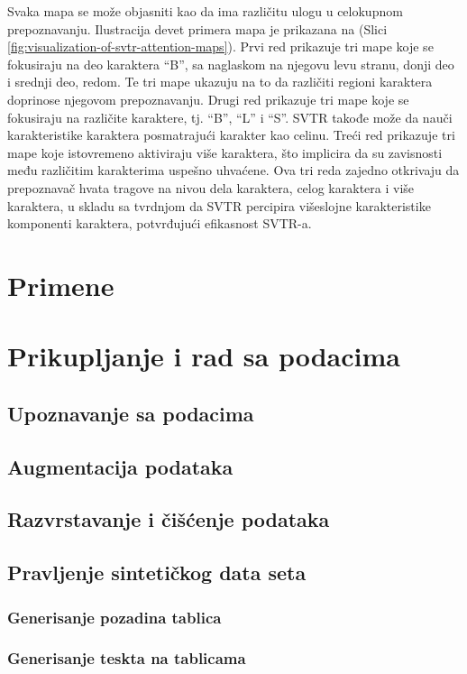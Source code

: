 \documentclass[a4paper,12pt]{article}
\begin{document}
	Svaka mapa se može objasniti kao da ima različitu ulogu u celokupnom prepoznavanju. Ilustracija devet primera mapa je prikazana na (Slici \ref{fig:visualization-of-svtr-attention-maps}). Prvi red prikazuje tri mape koje se fokusiraju na deo karaktera ``B'', sa naglaskom na njegovu levu stranu, donji deo i srednji deo, redom. Te tri mape ukazuju na to da različiti regioni karaktera doprinose njegovom prepoznavanju. Drugi red prikazuje tri mape koje se fokusiraju na različite karaktere, tj. ``B'', ``L'' i ``S''. SVTR takođe može da nauči karakteristike karaktera posmatrajući karakter kao celinu. Treći red prikazuje tri mape koje istovremeno aktiviraju više karaktera, što implicira da su zavisnosti među različitim karakterima uspešno uhvaćene. Ova tri reda zajedno otkrivaju da prepoznavač hvata tragove na nivou dela karaktera, celog karaktera i više karaktera, u skladu sa tvrdnjom da SVTR percipira višeslojne karakteristike komponenti karaktera, potvrđujući efikasnost SVTR-a.
	\newpage
	
	\section{Primene}
	\newpage
	
	\section{Prikupljanje i rad sa podacima}
	\subsection{Upoznavanje sa podacima}
	\subsection{Augmentacija podataka}
	\subsection{Razvrstavanje i čišćenje podataka}
	\subsection{Pravljenje sintetičkog data seta}
	\subsubsection{Generisanje pozadina tablica}
	\subsubsection{Generisanje teskta na tablicama}
	\newpage
	
\end{document}
